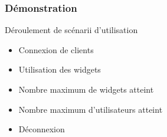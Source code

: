 \begin{frame}
	\frametitle{Démonstration}
	\begin{block}{Déroulement de scénarii d'utilisation}
		\begin{itemize}
			\item Connexion de clients
			\item Utilisation des widgets
			\item Nombre maximum de widgets atteint
			\item Nombre maximum d'utilisateurs atteint
			\item Déconnexion
		\end{itemize}
	\end{block}
\end{frame}
